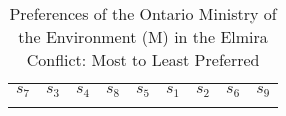 \begin{table}[!t]
   \centering
   \caption{Preferences of the Ontario Ministry of the Environment (M) in the Elmira Conflict: Most to Least Preferred}
   \setlength{\tabcolsep}{3pt}
   \renewcommand{\arraystretch}{1.3}
\begin{tabular}{x{1cm}x{1cm}x{1cm}x{1cm}x{1cm}x{1cm}x{1cm}x{1cm}x{1cm}}


   $s_7$ & $s_3$ & $s_4$ & $s_8$ & $s_5$ & $s_1$ & $s_2$ & $s_6$ & $s_9$ \\


\end{tabular}
\label{pref-MoE}
\end{table}

